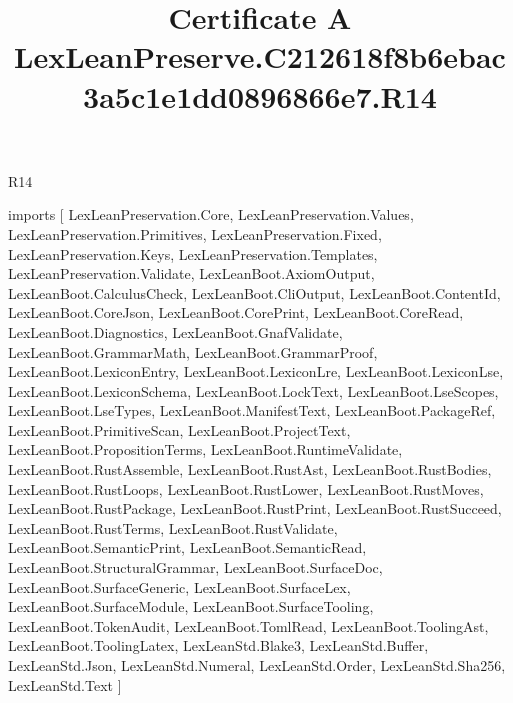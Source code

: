 \begin{lexlean}{R14}
\title{Certificate A LexLeanPreserve.C212618f8b6ebac3a5c1e1dd0896866e7.R14}
\begin{coremodule}
imports [
  LexLeanPreservation.Core,
  LexLeanPreservation.Values,
  LexLeanPreservation.Primitives,
  LexLeanPreservation.Fixed,
  LexLeanPreservation.Keys,
  LexLeanPreservation.Templates,
  LexLeanPreservation.Validate,
  LexLeanBoot.AxiomOutput,
  LexLeanBoot.CalculusCheck,
  LexLeanBoot.CliOutput,
  LexLeanBoot.ContentId,
  LexLeanBoot.CoreJson,
  LexLeanBoot.CorePrint,
  LexLeanBoot.CoreRead,
  LexLeanBoot.Diagnostics,
  LexLeanBoot.GnafValidate,
  LexLeanBoot.GrammarMath,
  LexLeanBoot.GrammarProof,
  LexLeanBoot.LexiconEntry,
  LexLeanBoot.LexiconLre,
  LexLeanBoot.LexiconLse,
  LexLeanBoot.LexiconSchema,
  LexLeanBoot.LockText,
  LexLeanBoot.LseScopes,
  LexLeanBoot.LseTypes,
  LexLeanBoot.ManifestText,
  LexLeanBoot.PackageRef,
  LexLeanBoot.PrimitiveScan,
  LexLeanBoot.ProjectText,
  LexLeanBoot.PropositionTerms,
  LexLeanBoot.RuntimeValidate,
  LexLeanBoot.RustAssemble,
  LexLeanBoot.RustAst,
  LexLeanBoot.RustBodies,
  LexLeanBoot.RustLoops,
  LexLeanBoot.RustLower,
  LexLeanBoot.RustMoves,
  LexLeanBoot.RustPackage,
  LexLeanBoot.RustPrint,
  LexLeanBoot.RustSucceed,
  LexLeanBoot.RustTerms,
  LexLeanBoot.RustValidate,
  LexLeanBoot.SemanticPrint,
  LexLeanBoot.SemanticRead,
  LexLeanBoot.StructuralGrammar,
  LexLeanBoot.SurfaceDoc,
  LexLeanBoot.SurfaceGeneric,
  LexLeanBoot.SurfaceLex,
  LexLeanBoot.SurfaceModule,
  LexLeanBoot.SurfaceTooling,
  LexLeanBoot.TokenAudit,
  LexLeanBoot.TomlRead,
  LexLeanBoot.ToolingAst,
  LexLeanBoot.ToolingLatex,
  LexLeanStd.Blake3,
  LexLeanStd.Buffer,
  LexLeanStd.Json,
  LexLeanStd.Numeral,
  LexLeanStd.Order,
  LexLeanStd.Sha256,
  LexLeanStd.Text
]


\end{coremodule}
\end{lexlean}
